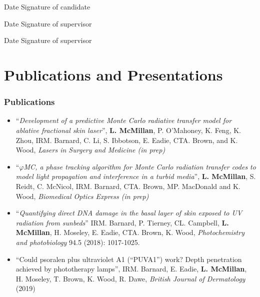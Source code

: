 \documentclass[10pt,a4paper,twoside]{book}
\begin{document}
\medskip

Date\dotfill \hspace{1cm} Signature of candidate \dotfill

\medskip

Date\dotfill \hspace{1cm} Signature of supervisor \dotfill

\medskip

\indent Date\dotfill \hspace{1cm} Signature of supervisor \dotfill

\chapter*{Publications and Presentations}
\subsection*{Publications}
\begin{itemize}

\item ``\textit{Development of a predictive Monte Carlo radiative transfer model for ablative fractional skin laser}'', \textbf{L. McMillan}, P. O'Mahoney, K. Feng, K. Zhou, IRM. Barnard, C. Li, S. Ibbotson, E. Eadie, CTA. Brown, and K. Wood, \textit{Lasers in Surgery and Medicine (in prep)}

\item ``\textit{$\varphi$MC, a phase tracking algorithm for Monte Carlo radiation transfer codes to model light propagation and interference in a turbid media}'', \textbf{L. McMillan}, S. Reidt, C. McNicol, IRM. Barnard, CTA. Brown, MP. MacDonald and K. Wood, \textit{Biomedical Optics Express (in prep)}

\item ``\textit{Quantifying direct DNA damage in the basal layer of skin exposed to UV radiation from sunbeds}'' IRM. Barnard, P. Tierney, CL. Campbell, \textbf{L. McMillan}, H. Moseley, E. Eadie, CTA. Brown, K. Wood, \textit{Photochemistry and photobiology} 94.5 (2018): 1017-1025.

\item ``Could psoralen plus ultraviolet A1 (“PUVA1”) work? Depth penetration achieved by phototherapy lamps'', IRM. Barnard, E. Eadie, \textbf{L. McMillan}, H. Moseley, T. Brown, K. Wood, R. Dawe, \textit{British Journal of Dermatology} (2019)

\end{itemize}
\end{document}
